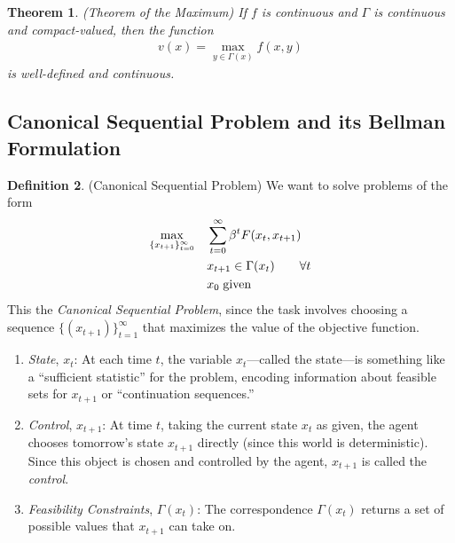 \documentclass[12pt]{article}
\numberwithin{equation}{section} %
\theoremstyle{plain}
\newtheorem{thm}{Theorem}[section]
\theoremstyle{definition}
\newtheorem{defn}[thm]{Definition}
\theoremstyle{remark}
\newcommand{\sumtinfz}{\sum^\infty_{t=0}}
\begin{document}
\begin{thm}{\emph{(Theorem of the Maximum)}}
If $f$ is continuous and $\Gamma$ is continuous and compact-valued, then
the function
\begin{align}
  \label{prob:thm-max}
  v(x) = \max_{y\in\Gamma(x)} f(x,y)
\end{align}
is well-defined and continuous.
\end{thm}



\subsection{Canonical Sequential Problem and its Bellman Formulation}


\begin{defn}{(Canonical Sequential Problem)}
We want to solve problems of the form
\begin{align}
  \label{prob:sequential-short}
  \max_{\{x_{t+1}\}_{t=0}^\infty}
  \quad &\sumtinfz \beta^t F(x_t,x_{t+1})\\
  &x_{t+1} \in \Gamma(x_t) \qquad \forall t\notag\\
  &x_0 \; \text{given}\notag
\end{align}
This the \emph{Canonical Sequential Problem}, since the task involves
choosing a sequence $\{(x_{t+1})\}_{t=1}^\infty$ that maximizes the
value of the objective function.
\begin{enumerate}
  \item \emph{State}, $x_t$: At each time $t$, the variable
    $x_t$---called the state---is something like a ``sufficient
    statistic'' for the problem, encoding information about feasible
    sets for $x_{t+1}$ or ``continuation sequences.''
  \item \emph{Control}, $x_{t+1}$: At time $t$, taking the current state
    $x_t$ as given, the agent chooses tomorrow's state $x_{t+1}$
    directly (since this world is deterministic). Since this object is
    chosen and controlled by the agent, $x_{t+1}$ is called the
    \emph{control}.
  \item \emph{Feasibility Constraints}, $\Gamma(x_t)$: The
    correspondence $\Gamma(x_t)$ returns a set of possible values that
    $x_{t+1}$ can take on.
\end{enumerate}
\end{defn}
\end{document}
